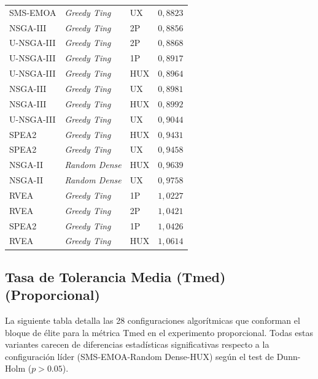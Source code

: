 \begin{longtable}{lllc}
SMS-EMOA & \textit{Greedy Ting} & UX & $0{,}8823$ \\
NSGA-III & \textit{Greedy Ting} & 2P & $0{,}8856$ \\
U-NSGA-III & \textit{Greedy Ting} & 2P & $0{,}8868$ \\
U-NSGA-III & \textit{Greedy Ting} & 1P & $0{,}8917$ \\
U-NSGA-III & \textit{Greedy Ting} & HUX & $0{,}8964$ \\
NSGA-III & \textit{Greedy Ting} & UX & $0{,}8981$ \\
NSGA-III & \textit{Greedy Ting} & HUX & $0{,}8992$ \\
U-NSGA-III & \textit{Greedy Ting} & UX & $0{,}9044$ \\
SPEA2 & \textit{Greedy Ting} & HUX & $0{,}9431$ \\
SPEA2 & \textit{Greedy Ting} & UX & $0{,}9458$ \\
NSGA-II & \textit{Random Dense} & HUX & $0{,}9639$ \\
NSGA-II & \textit{Random Dense} & UX & $0{,}9758$ \\
RVEA & \textit{Greedy Ting} & 1P & $1{,}0227$ \\
RVEA & \textit{Greedy Ting} & 2P & $1{,}0421$ \\
SPEA2 & \textit{Greedy Ting} & 1P & $1{,}0426$ \\
RVEA & \textit{Greedy Ting} & HUX & $1{,}0614$ \\
\end{longtable}

\subsection{Tasa de Tolerancia Media (Tmed) (Proporcional)}\label{anexo:elite_avgt_prop}

La siguiente tabla detalla las 28 configuraciones algorítmicas que conforman el bloque de élite para la métrica Tmed en el experimento proporcional. Todas estas variantes carecen de diferencias estadísticas significativas respecto a la configuración líder (SMS-EMOA-Random Dense-HUX) según el test de Dunn-Holm ($p > 0.05$).

